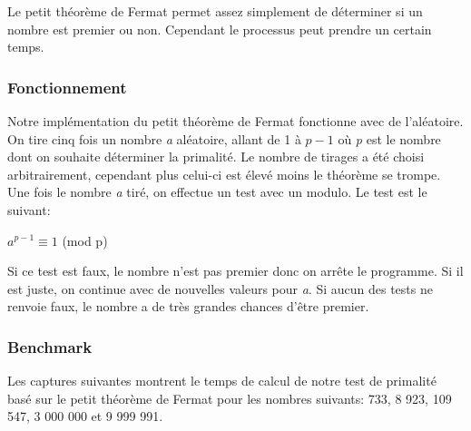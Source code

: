 Le petit théorème de Fermat permet assez simplement de déterminer si un nombre est premier ou non. Cependant le processus peut prendre un certain temps.\\

\subsubsection{Fonctionnement}

Notre implémentation du petit théorème de Fermat fonctionne avec de l'aléatoire. On tire cinq fois un nombre \textit{a} aléatoire, allant de 1 à $p-1$ où \textit{p} est le nombre dont on souhaite déterminer la primalité. Le nombre de tirages a été choisi arbitrairement, cependant plus celui-ci est élevé moins le théorème se trompe.\\
Une fois le nombre \textit{a} tiré, on effectue un test avec un modulo. Le test est le suivant:\\
\begin{center}
$a^{p-1} \equiv 1$ (mod p)
\end{center}
Si ce test est faux, le nombre n'est pas premier donc on arrête le programme. Si il est juste, on continue avec de nouvelles valeurs pour \textit{a}. Si aucun des tests ne renvoie faux, le nombre a de très grandes chances d'être premier.

\newpage
\subsubsection{Benchmark}

Les captures suivantes montrent le temps de calcul de notre test de primalité basé sur le petit théorème de Fermat pour les nombres suivants: 733, 8 923, 109 547, 3 000 000 et 9 999 991.\\

